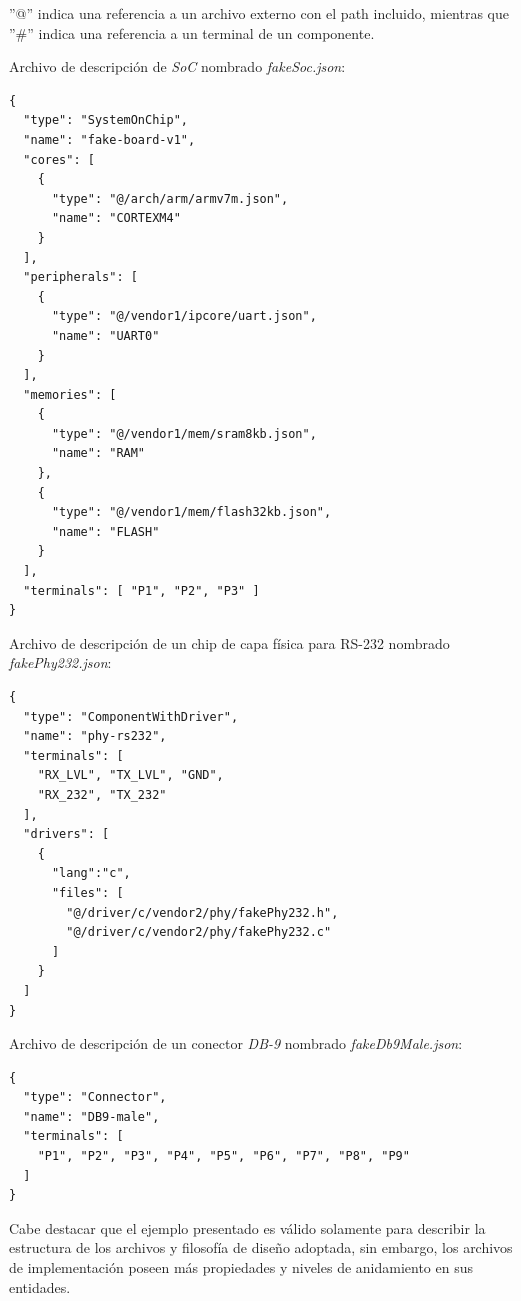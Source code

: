''@'' indica una referencia a un archivo externo con el path incluido, mientras que ''\#'' indica una referencia a un terminal de un componente.

Archivo de descripción de \emph{SoC} nombrado \emph{fakeSoc.json}:

\begin{verbatim}
{
  "type": "SystemOnChip",
  "name": "fake-board-v1",
  "cores": [
    {
      "type": "@/arch/arm/armv7m.json",
      "name": "CORTEXM4"
    }
  ],
  "peripherals": [
    {
      "type": "@/vendor1/ipcore/uart.json",
      "name": "UART0"
    }
  ],
  "memories": [
    {
      "type": "@/vendor1/mem/sram8kb.json",
      "name": "RAM"
    },
    {
      "type": "@/vendor1/mem/flash32kb.json",
      "name": "FLASH"
    }
  ],
  "terminals": [ "P1", "P2", "P3" ]
}
\end{verbatim}

Archivo de descripción de un chip de capa física para RS-232  nombrado \emph{fakePhy232.json}:

\begin{verbatim}
{
  "type": "ComponentWithDriver",
  "name": "phy-rs232",
  "terminals": [ 
    "RX_LVL", "TX_LVL", "GND",
    "RX_232", "TX_232"
  ],
  "drivers": [
    {
      "lang":"c",
      "files": [
        "@/driver/c/vendor2/phy/fakePhy232.h",
        "@/driver/c/vendor2/phy/fakePhy232.c"      
      ]      
    }
  ]
}
\end{verbatim}

Archivo de descripción de un conector \emph{DB-9} nombrado \emph{fakeDb9Male.json}:

\begin{verbatim}
{
  "type": "Connector",
  "name": "DB9-male",
  "terminals": [ 
    "P1", "P2", "P3", "P4", "P5", "P6", "P7", "P8", "P9"
  ]
}
\end{verbatim}

Cabe destacar que el ejemplo presentado es válido solamente para describir la estructura de los archivos y filosofía de diseño adoptada, sin embargo, los archivos de implementación poseen más propiedades y niveles de anidamiento en sus entidades.
